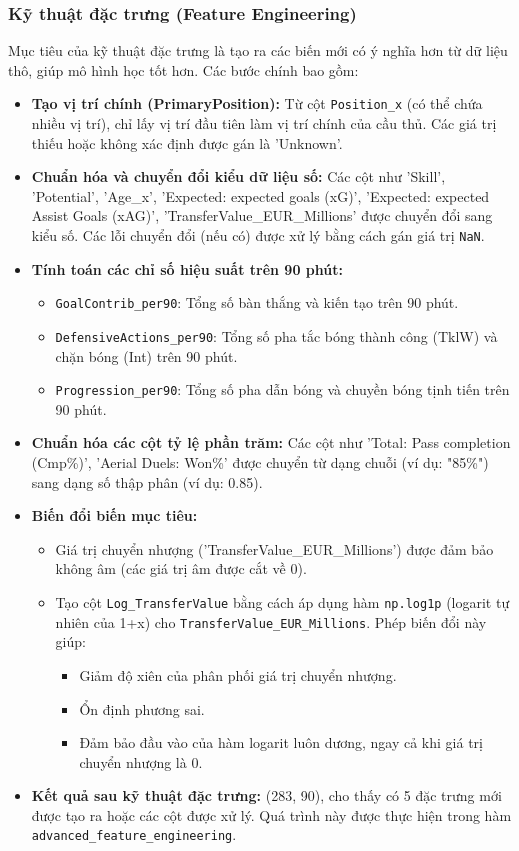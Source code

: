 \documentclass[12pt, a4paper]{report}
\begin{document}
\subsubsection*{Kỹ thuật đặc trưng (Feature Engineering)}

Mục tiêu của kỹ thuật đặc trưng là tạo ra các biến mới có ý nghĩa hơn từ dữ liệu thô, giúp mô hình học tốt hơn. Các bước chính bao gồm:
\begin{itemize}
    \item \textbf{Tạo vị trí chính (PrimaryPosition):} Từ cột \texttt{Position\_x} (có thể chứa nhiều vị trí), chỉ lấy vị trí đầu tiên làm vị trí chính của cầu thủ. Các giá trị thiếu hoặc không xác định được gán là 'Unknown'.
    \item \textbf{Chuẩn hóa và chuyển đổi kiểu dữ liệu số:} Các cột như 'Skill', 'Potential', 'Age\_x', 'Expected: expected goals (xG)', 'Expected: expected Assist Goals (xAG)', 'TransferValue\_EUR\_Millions' được chuyển đổi sang kiểu số. Các lỗi chuyển đổi (nếu có) được xử lý bằng cách gán giá trị \texttt{NaN}.
    \item \textbf{Tính toán các chỉ số hiệu suất trên 90 phút:}
    \begin{itemize}
        \item \texttt{GoalContrib\_per90}: Tổng số bàn thắng và kiến tạo trên 90 phút.
        \item \texttt{DefensiveActions\_per90}: Tổng số pha tắc bóng thành công (TklW) và chặn bóng (Int) trên 90 phút.
        \item \texttt{Progression\_per90}: Tổng số pha dẫn bóng và chuyền bóng tịnh tiến trên 90 phút.
    \end{itemize}
    \item \textbf{Chuẩn hóa các cột tỷ lệ phần trăm:} Các cột như 'Total: Pass completion (Cmp\%)', 'Aerial Duels: Won\%' được chuyển từ dạng chuỗi (ví dụ: "85\%") sang dạng số thập phân (ví dụ: 0.85).
    \item \textbf{Biến đổi biến mục tiêu:}
    \begin{itemize}
        \item Giá trị chuyển nhượng ('TransferValue\_EUR\_Millions') được đảm bảo không âm (các giá trị âm được cắt về 0).
        \item Tạo cột \texttt{Log\_TransferValue} bằng cách áp dụng hàm \texttt{np.log1p} (logarit tự nhiên của 1+x) cho \texttt{TransferValue\_EUR\_Millions}. Phép biến đổi này giúp:
        \begin{itemize}
            \item Giảm độ xiên của phân phối giá trị chuyển nhượng.
            \item Ổn định phương sai.
            \item Đảm bảo đầu vào của hàm logarit luôn dương, ngay cả khi giá trị chuyển nhượng là 0.
        \end{itemize}
    \end{itemize}
    \item \textbf{Kết quả sau kỹ thuật đặc trưng:} (283, 90), cho thấy có 5 đặc trưng mới được tạo ra hoặc các cột được xử lý. Quá trình này được thực hiện trong hàm \texttt{advanced\_feature\_engineering}.
\end{itemize}
\end{document}
